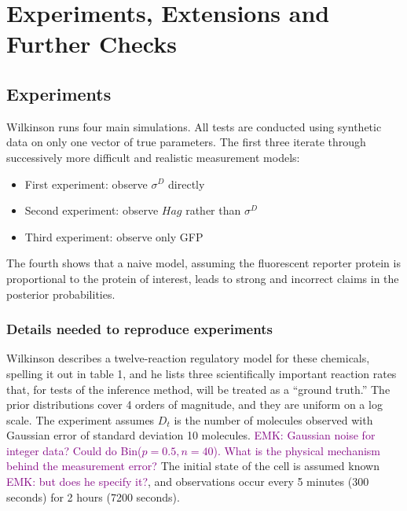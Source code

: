 \documentclass{article}
\newcommand\EMK[1]{\textcolor{purple}{EMK: #1}}
\begin{document}
\section{Experiments, Extensions and Further Checks}
\subsection{Experiments}

Wilkinson runs four main simulations. All tests are conducted using synthetic data on only one vector of true parameters. The first three iterate through successively more difficult and realistic measurement models:
\begin{itemize}
\item First experiment: observe $\sigma^D$  directly
\item Second experiment: observe $Hag$ rather than $\sigma^D$
\item Third experiment: observe only GFP
\end{itemize}

The fourth shows that a naive model, assuming the fluorescent reporter protein is proportional to the protein of interest, leads to strong and incorrect claims in the posterior probabilities. 

\subsubsection{Details needed to reproduce experiments}
Wilkinson describes a twelve-reaction regulatory model for these chemicals, spelling it out in table 1, and he lists three scientifically important reaction rates that, for tests of the inference method, will be treated as a ``ground truth.'' The prior distributions cover 4 orders of magnitude, and they are uniform on a log scale. The experiment assumes $D_t$ is the number of molecules observed with Gaussian error of standard deviation 10 molecules. \EMK{Gaussian noise for integer data? Could do Bin($p=0.5, n=40$). What is the physical mechanism behind the measurement error?} The initial state of the cell is assumed known \EMK{but does he specify it?}, and observations occur every 5 minutes (300 seconds) for 2 hours (7200 seconds). 

\end{document}
